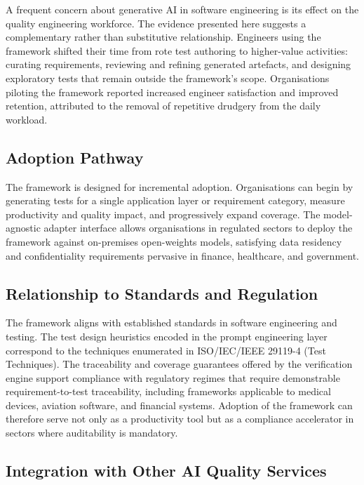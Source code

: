 \documentclass[conference]{IEEEtran}
\begin{document}
A frequent concern about generative AI in software engineering is its effect on the quality engineering workforce. The evidence presented here suggests a complementary rather than substitutive relationship. Engineers using the framework shifted their time from rote test authoring to higher-value activities: curating requirements, reviewing and refining generated artefacts, and designing exploratory tests that remain outside the framework's scope. Organisations piloting the framework reported increased engineer satisfaction and improved retention, attributed to the removal of repetitive drudgery from the daily workload.

\subsection{Adoption Pathway}

The framework is designed for incremental adoption. Organisations can begin by generating tests for a single application layer or requirement category, measure productivity and quality impact, and progressively expand coverage. The model-agnostic adapter interface allows organisations in regulated sectors to deploy the framework against on-premises open-weights models, satisfying data residency and confidentiality requirements pervasive in finance, healthcare, and government.

\subsection{Relationship to Standards and Regulation}

The framework aligns with established standards in software engineering and testing. The test design heuristics encoded in the prompt engineering layer correspond to the techniques enumerated in ISO/IEC/IEEE 29119-4 (Test Techniques). The traceability and coverage guarantees offered by the verification engine support compliance with regulatory regimes that require demonstrable requirement-to-test traceability, including frameworks applicable to medical devices, aviation software, and financial systems. Adoption of the framework can therefore serve not only as a productivity tool but as a compliance accelerator in sectors where auditability is mandatory.

\subsection{Integration with Other AI Quality Services}
\end{document}

